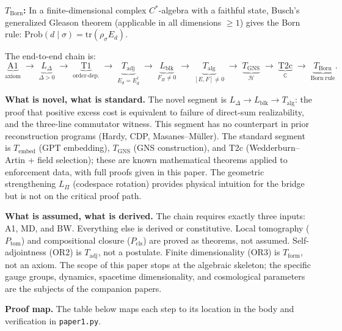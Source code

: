 \documentclass[11pt]{article}
\theoremstyle{remark}
\begin{document}
\textbf{$T_{\mathrm{Born}}$:}  In a finite-dimensional complex $C^*$-algebra
with a faithful state, Busch's generalized Gleason theorem (applicable in all
dimensions $\ge 1$) gives the Born rule:
$\mathrm{Prob}(d \mid \sigma) = \mathrm{tr}(\rho_\sigma E_d)$.

\medskip

\noindent The end-to-end chain is:
\begin{equation}\label{eq:arg_chain}
\underbrace{\text{A1}}_{\text{axiom}} \;\to\;
\underbrace{L_\Delta}_{\Delta > 0} \;\to\;
\underbrace{\text{T1}}_{\text{order-dep.}} \;\to\;
\underbrace{T_{\mathrm{adj}}}_{E_d = E_d^\dagger} \;\to\;
\underbrace{L_{\mathrm{blk}}}_{F_\Pi \ne 0} \;\to\;
\underbrace{T_{\mathrm{alg}}}_{[E,F]\ne 0} \;\to\;
\underbrace{T_{\mathrm{GNS}}}_{\mathcal{H}} \;\to\;
\underbrace{\text{T2c}}_{\mathbb{C}} \;\to\;
\underbrace{T_{\mathrm{Born}}}_{\mathrm{Born\;rule}}.
\end{equation}

\medskip

\noindent\textbf{What is novel, what is standard.}  The novel segment is
$L_\Delta \to L_{\mathrm{blk}} \to T_{\mathrm{alg}}$: the proof that positive
excess cost is equivalent to failure of direct-sum realizability, and the
three-line commutator witness.  This segment has no counterpart in prior
reconstruction programs (Hardy, CDP, Masanes--M\"{u}ller).  The standard
segment is $T_{\mathrm{embed}}$ (GPT embedding), $T_{\mathrm{GNS}}$ (GNS
construction), and T2c (Wedderburn--Artin + field selection); these are known
mathematical theorems applied to enforcement data, with full proofs given in
this paper.  The geometric strengthening $L_\Pi$ (codespace rotation) provides
physical intuition for the bridge but is not on the critical proof path.

\medskip

\noindent\textbf{What is assumed, what is derived.}  The chain requires
exactly three inputs: A1, MD, and BW.  Everything else is derived or
constitutive.  Local tomography ($P_{\mathrm{tom}}$) and compositional closure
($P_{\mathrm{cls}}$) are proved as theorems, not assumed.  Self-adjointness
(OR2) is $T_{\mathrm{adj}}$, not a postulate.  Finite dimensionality (OR3) is
$T_{\mathrm{form}}$, not an axiom.  The scope of this paper stops at the
algebraic skeleton; the specific gauge groups, dynamics, spacetime
dimensionality, and cosmological parameters are the subjects of the companion
papers.

\medskip

\noindent\textbf{Proof map.}  The table below maps each step to its location
in the body and verification in \texttt{paper1.py}.
\end{document}
